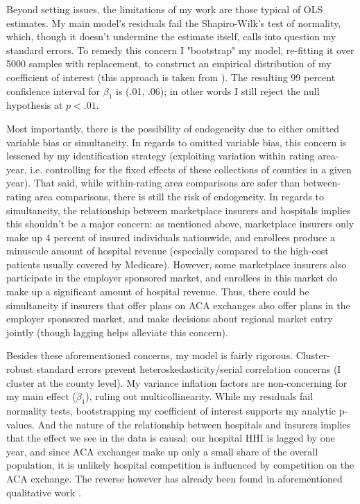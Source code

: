\documentclass[12pt,letterpaper]{article}
\begin{document}
Beyond setting issues, the limitations of my work are those typical of OLS estimates. My main model's residuals fail the Shapiro-Wilk's test of normality, which, though it doesn't undermine the estimate itself, calls into question my standard errors. To remedy this concern I "bootstrap" my model, re-fitting it over 5000 samples with replacement, to construct an empirical distribution of my coefficient of interest (this approach is taken from \citet{fox_bootstrapping_2017}). The resulting 99 percent confidence interval for $\beta_1$ is (.01, .06); in other words I still reject the null hypothesis at $p<.01$. 

Most importantly, there is the possibility of endogeneity due to either omitted variable bias or simultaneity. In regards to omitted variable bias, this concern is lessened by my identification strategy (exploiting variation within rating area-year, i.e. controlling for the fixed effects of these collections of counties in a given year). That said, while within-rating area comparisons are safer than between-rating area comparisons, there is still the risk of endogeneity. In regards to simultaneity, the relationship between marketplace insurers and hospitals implies this shouldn't be a major concern: as mentioned above, marketplace insurers only make up 4 percent of insured individuals nationwide, and enrollees produce a minuscule amount of hospital revenue (especially compared to the high-cost patients usually covered by Medicare). However, some marketplace insurers also participate in the employer sponsored market, and enrollees in this market do make up a significant amount of hospital revenue. Thus, there could be simultaneity if insurers that offer plans on ACA exchanges also offer plans in the employer sponsored market, and make decisions about regional market entry jointly (though lagging helps alleviate this concern). 

Besides these aforementioned concerns, my model is fairly rigorous. Cluster-robust standard errors prevent heteroskedasticity/serial correlation concerns (I cluster at the county level). My variance inflation factors are non-concerning for my main effect ($\beta_1$), ruling out multicollinearity. While my residuals fail normality tests, bootstrapping my coefficient of interest supports my analytic p-values. And the nature of the relationship between hospitals and insurers implies that the effect we see in the data is causal: our hospital HHI is lagged by one year, and since ACA exchanges make up only a small share of the overall population, it is unlikely hospital competition is influenced by competition on the ACA exchange. The reverse however has already been found in aforementioned qualitative work \citep{morrisey_five-state_2017}.  
\end{document}
